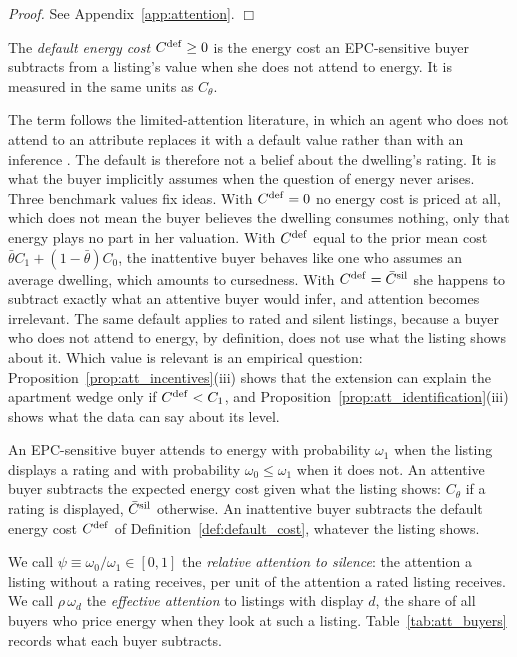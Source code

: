 \noindent\textit{Proof.} See Appendix~\ref{app:attention}. $\Box$

\begin{definition}
\label{def:default_cost}
The \emph{default energy cost} $C^{\rm def}\ge0$ is the energy cost an EPC-sensitive buyer subtracts from a listing's value when she does not attend to energy. It is measured in the same units as $C_\theta$.
\end{definition}

The term follows the limited-attention literature, in which an agent who does not attend to an attribute replaces it with a default value rather than with an inference \citep{gabaix_sparsity_2014, gabaix_behavioral_2019}. The default is therefore not a belief about the dwelling's rating. It is what the buyer implicitly assumes when the question of energy never arises. Three benchmark values fix ideas. With $C^{\rm def}=0$ no energy cost is priced at all, which does not mean the buyer believes the dwelling consumes nothing, only that energy plays no part in her valuation. With $C^{\rm def}$ equal to the prior mean cost $\bar\theta C_1+(1-\bar\theta)C_0$, the inattentive buyer behaves like one who assumes an average dwelling, which amounts to cursedness. With $C^{\rm def}=\bar C^{\rm sil}$ she happens to subtract exactly what an attentive buyer would infer, and attention becomes irrelevant. The same default applies to rated and silent listings, because a buyer who does not attend to energy, by definition, does not use what the listing shows about it. Which value is relevant is an empirical question: Proposition~\ref{prop:att_incentives}(iii) shows that the extension can explain the apartment wedge only if $C^{\rm def}<C_1$, and Proposition~\ref{prop:att_identification}(iii) shows what the data can say about its level.

\begin{assumption}
\label{assum:attention}
An EPC-sensitive buyer attends to energy with probability $\omega_1$ when the listing displays a rating and with probability $\omega_0\le\omega_1$ when it does not. An attentive buyer subtracts the expected energy cost given what the listing shows: $C_\theta$ if a rating is displayed, $\bar C^{\rm sil}$ otherwise. An inattentive buyer subtracts the default energy cost $C^{\rm def}$ of Definition~\ref{def:default_cost}, whatever the listing shows.
\end{assumption}

We call $\psi\equiv\omega_0/\omega_1\in[0,1]$ the \emph{relative attention to silence}: the attention a listing without a rating receives, per unit of the attention a rated listing receives. We call $\rho\,\omega_d$ the \emph{effective attention} to listings with display $d$, the share of all buyers who price energy when they look at such a listing. Table~\ref{tab:att_buyers} records what each buyer subtracts.

